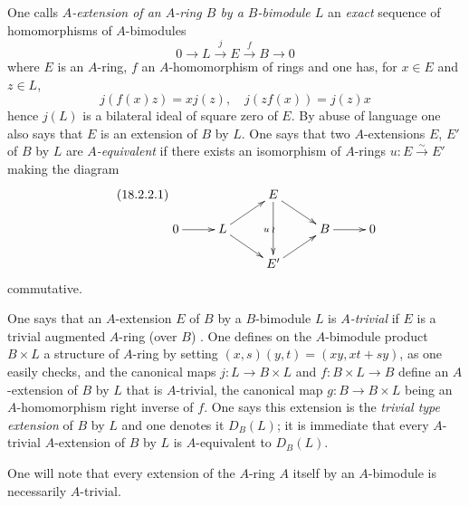 \begin{env}[18.2.2]
\label{0.18.2.2}
One calls \emph{$A$-extension of an $A$-ring $B$ by a $B$-bimodule $L$} an \emph{exact} sequence of homomorphisms of $A$-bimodules
\[
  0\to L\xrightarrow{j} E\xrightarrow{f} B\to 0
\]
where $E$ is an $A$-ring, $f$ an $A$-homomorphism of rings and one has, for $x\in E$ and $z\in L$,
\[
  j(f(x)z)=xj(z),\quad j(zf(x))=j(z)x
\]
hence  $j(L)$ is a bilateral ideal of square zero of $E$.
By abuse of language one also says that $E$ is an extension of $B$ by $L$.
One says that two $A$-extensions $E$, $E'$ of $B$ by $L$ are \emph{$A$-equivalent} if there exists an isomorphism of $A$-rings $u:E\xrightarrow{\sim} E'$ making the diagram
\begin{equation}
\tag{18.2.2.1}
  \label{0.18.2.2.1}
  \xymatrix@C=2.1pc@R=1.2pc{
    & & E\ar[dr]\ar[dd]_u\ar@{}[dd]|{\wr} & & \\
    0\ar[r] & L\ar[ur]\ar[dr] & & B\ar[r] & 0\\
    & & E'\ar[ur] & &
  }
\end{equation}
commutative.
\end{env}

\begin{env}[18.2.3]
\label{0.18.2.3}
One says that an $A$-extension $E$ of $B$ by a $B$-bimodule $L$ is \emph{$A$-trivial} if $E$ is a trivial augmented $A$-ring (over $B$) .
One defines on the $A$-bimodule product $B\times L$ a structure of $A$-ring by setting $(x,s)(y,t)=(xy,xt+sy)$, as one easily checks, and the canonical maps $j:L\to B\times L$ and $f:B\times L\to B$ define an $A$-extension of $B$ by $L$ that is $A$-trivial, the canonical map $g:B\to B\times L$ being an $A$-homomorphism right inverse of $f$.
One says this extension is the \emph{trivial type extension} of $B$ by $L$ and one denotes it $D_B(L)$; it is immediate that every $A$-trivial $A$-extension of $B$ by $L$ is $A$-equivalent to $D_B(L)$.

One will note that every extension of the $A$-ring $A$ itself by an $A$-bimodule is necessarily $A$-trivial.
\end{env}

